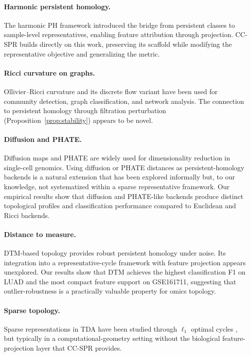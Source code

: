 \documentclass[11pt]{article}
\begin{document}
\paragraph{Harmonic persistent homology.}
The harmonic PH framework \cite{harmonicPH} introduced the bridge from persistent classes to sample-level representatives, enabling feature attribution through projection.
CC-SPR builds directly on this work, preserving its scaffold while modifying the representative objective and generalizing the metric.

\paragraph{Ricci curvature on graphs.}
Ollivier--Ricci curvature \cite{ollivier2007, ollivier2009} and its discrete flow variant \cite{ni2019community} have been used for community detection, graph classification, and network analysis.
The connection to persistent homology through filtration perturbation (Proposition~\ref{prop:stability}) appears to be novel.

\paragraph{Diffusion and PHATE.}
Diffusion maps \cite{coifman2006diffusion} and PHATE \cite{moon2019phate} are widely used for dimensionality reduction in single-cell genomics.
Using diffusion or PHATE distances as persistent-homology backends is a natural extension that has been explored informally but, to our knowledge, not systematized within a sparse representative framework.
Our empirical results show that diffusion and PHATE-like backends produce distinct topological profiles and classification performance compared to Euclidean and Ricci backends.

\paragraph{Distance to measure.}
DTM-based topology \cite{chazal2011dtm, chazal2017robust} provides robust persistent homology under noise.
Its integration into a representative-cycle framework with feature projection appears unexplored.
Our results show that DTM achieves the highest classification F1 on LUAD and the most compact feature support on GSE161711, suggesting that outlier-robustness is a practically valuable property for omics topology.

\paragraph{Sparse topology.}
Sparse representations in TDA have been studied through $\ell_1$ optimal cycles \cite{chen2011hardness, dey2011optimal}, but typically in a computational-geometry setting without the biological feature-projection layer that CC-SPR provides.
\end{document}
